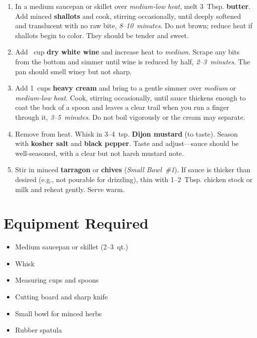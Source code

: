 \documentclass[11pt,letterpaper]{article}
\begin{document}
\begin{enumerate}
    \item In a medium saucepan or skillet over \textit{medium-low heat}, melt 3~Tbsp. \textbf{butter}. Add minced \textbf{shallots} and cook, stirring occasionally, until deeply softened and translucent with no raw bite, \textit{8--10~minutes}. Do not brown; reduce heat if shallots begin to color. They should be tender and sweet.

    \item Add ~cup \textbf{dry white wine} and increase heat to \textit{medium}. Scrape any bits from the bottom and simmer until wine is reduced by half, \textit{2--3~minutes}. The pan should smell winey but not sharp.

    \item Add 1~cups \textbf{heavy cream} and bring to a gentle simmer over \textit{medium} or \textit{medium-low heat}. Cook, stirring occasionally, until sauce thickens enough to coat the back of a spoon and leaves a clear trail when you run a finger through it, \textit{3--5~minutes}. Do not boil vigorously or the cream may separate.

    \item Remove from heat. Whisk in 3--4~tsp. \textbf{Dijon mustard} (to taste). Season with \textbf{kosher salt} and \textbf{black pepper}. Taste and adjust---sauce should be well-seasoned, with a clear but not harsh mustard note.

    \item Stir in minced \textbf{tarragon} or \textbf{chives} (\textit{Small Bowl~\#1}). If sauce is thicker than desired (e.g., not pourable for drizzling), thin with 1--2~Tbsp. chicken stock or milk and reheat gently. Serve warm.
\end{enumerate}

\newpage

\section*{Equipment Required}
\begin{itemize}
    \item Medium saucepan or skillet (2--3~qt.)
    \item Whisk
    \item Measuring cups and spoons
    \item Cutting board and sharp knife
    \item Small bowl for minced herbs
    \item Rubber spatula
\end{itemize}
\end{document}
